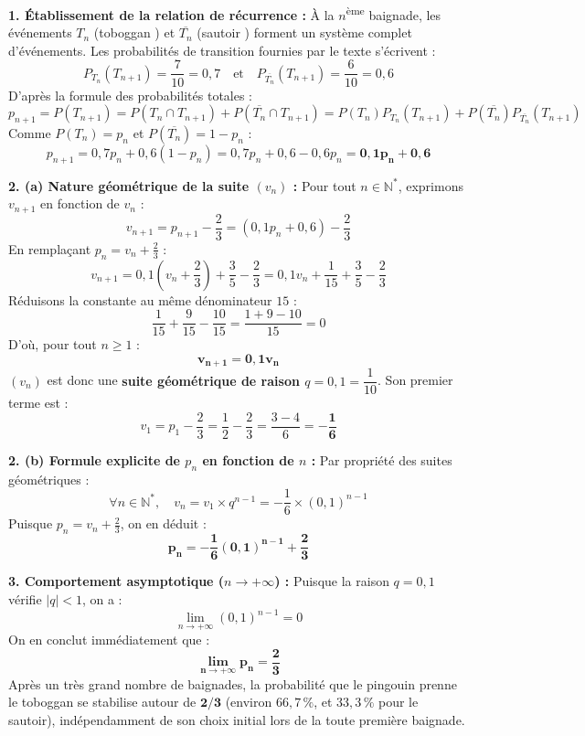 \documentclass[11pt,a4paper]{article}
\newcommand{\N}{\mathbb{N}}
\begin{document}
\begin{correctionbox}
\textbf{1. Établissement de la relation de récurrence :}
À la $n$\textsuperscript{ème} baignade, les événements $T_n$ (\og toboggan \fg{}) et $\overline{T_n}$ (\og sautoir \fg{}) forment un système complet d'événements.
Les probabilités de transition fournies par le texte s'écrivent :
\[
P_{T_n}(T_{n+1}) = \frac{7}{10} = 0{,}7 \quad \text{et} \quad P_{\overline{T_n}}(T_{n+1}) = \frac{6}{10} = 0{,}6
\]
D'après la formule des probabilités totales :
\[
p_{n+1} = P(T_{n+1}) = P(T_n \cap T_{n+1}) + P(\overline{T_n} \cap T_{n+1}) = P(T_n) P_{T_n}(T_{n+1}) + P(\overline{T_n}) P_{\overline{T_n}}(T_{n+1})
\]
Comme $P(T_n) = p_n$ et $P(\overline{T_n}) = 1 - p_n$ :
\[
p_{n+1} = 0{,}7 p_n + 0{,}6 (1 - p_n) = 0{,}7 p_n + 0{,}6 - 0{,}6 p_n = \mathbf{0{,}1 p_n + 0{,}6}
\]

\textbf{2. (a) Nature géométrique de la suite $(v_n)$ :}
Pour tout $n \in \N^*$, exprimons $v_{n+1}$ en fonction de $v_n$ :
\[
v_{n+1} = p_{n+1} - \frac{2}{3} = (0{,}1 p_n + 0{,}6) - \frac{2}{3}
\]
En remplaçant $p_n = v_n + \frac{2}{3}$ :
\[
v_{n+1} = 0{,}1 \left(v_n + \frac{2}{3}\right) + \frac{3}{5} - \frac{2}{3} = 0{,}1 v_n + \frac{1}{15} + \frac{3}{5} - \frac{2}{3}
\]
Réduisons la constante au même dénominateur $15$ :
\[
\frac{1}{15} + \frac{9}{15} - \frac{10}{15} = \frac{1 + 9 - 10}{15} = 0
\]
D'où, pour tout $n \ge 1$ :
\[
\mathbf{v_{n+1} = 0{,}1 v_n}
\]
$(v_n)$ est donc une \textbf{suite géométrique de raison $q = 0{,}1 = \dfrac{1}{10}$}.
Son premier terme est :
\[
v_1 = p_1 - \frac{2}{3} = \frac{1}{2} - \frac{2}{3} = \frac{3 - 4}{6} = \mathbf{-\frac{1}{6}}
\]

\textbf{2. (b) Formule explicite de $p_n$ en fonction de $n$ :}
Par propriété des suites géométriques :
\[
\forall n \in \N^*, \quad v_n = v_1 \times q^{n-1} = -\frac{1}{6} \times (0{,}1)^{n-1}
\]
Puisque $p_n = v_n + \frac{2}{3}$, on en déduit :
\[
\mathbf{p_n = -\frac{1}{6} (0{,}1)^{n-1} + \frac{2}{3}}
\]

\textbf{3. Comportement asymptotique ($n \to +\infty$) :}
Puisque la raison $q = 0{,}1$ vérifie $|q| < 1$, on a :
\[
\lim_{n \to +\infty} (0{,}1)^{n-1} = 0
\]
On en conclut immédiatement que :
\[
\mathbf{\lim_{n \to +\infty} p_n = \frac{2}{3}}
\]
Après un très grand nombre de baignades, la probabilité que le pingouin prenne le toboggan se stabilise autour de $\mathbf{2/3}$ (environ $66{,}7\,\%$, et $33{,}3\,\%$ pour le sautoir), indépendamment de son choix initial lors de la toute première baignade.
\end{correctionbox}
\end{document}
